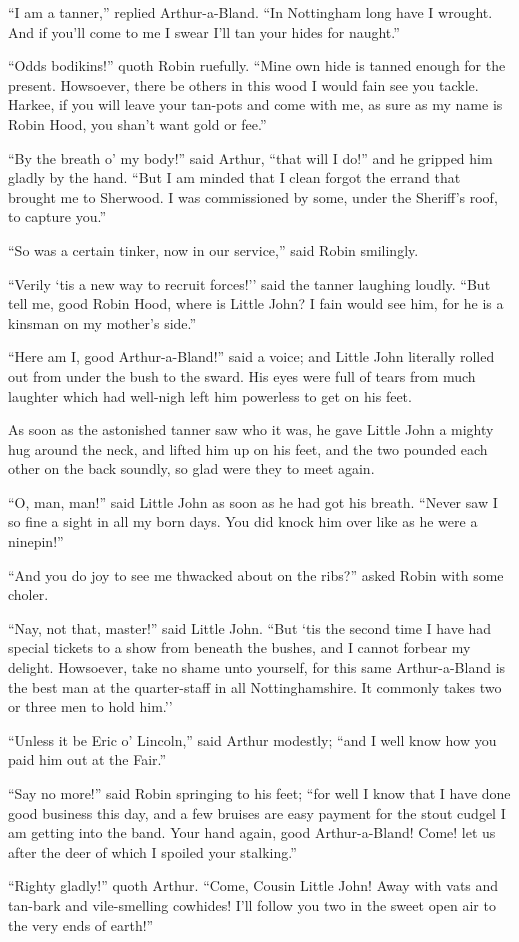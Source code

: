 ``I am a tanner,'' replied Arthur-a-Bland. ``In Nottingham long have I
wrought. And if you'll come to me I swear I'll tan your hides for
naught.''

``Odds bodikins!'' quoth Robin ruefully. ``Mine own hide is tanned
enough for the present. Howsoever, there be others in this wood I would
fain see you tackle. Harkee, if you will leave your tan-pots and come
with me, as sure as my name is Robin Hood, you shan't want gold or
fee.''

``By the breath o' my body!'' said Arthur, ``that will I do!'' and he
gripped him gladly by the hand. ``But I am minded that I clean forgot
the errand that brought me to Sherwood. I was commissioned by some,
under the Sheriff's roof, to capture you.''

``So was a certain tinker, now in our service,'' said Robin smilingly.

``Verily `tis a new way to recruit forces!'' said the tanner laughing
loudly. ``But tell me, good Robin Hood, where is Little John? I fain
would see him, for he is a kinsman on my mother's side.''

``Here am I, good Arthur-a-Bland!'' said a voice; and Little John
literally rolled out from under the bush to the sward. His eyes were
full of tears from much laughter which had well-nigh left him powerless
to get on his feet.

As soon as the astonished tanner saw who it was, he gave Little John a
mighty hug around the neck, and lifted him up on his feet, and the two
pounded each other on the back soundly, so glad were they to meet again.

``O, man, man!'' said Little John as soon as he had got his breath.
``Never saw I so fine a sight in all my born days. You did knock him
over like as he were a ninepin!''

``And you do joy to see me thwacked about on the ribs?'' asked Robin
with some choler.

``Nay, not that, master!'' said Little John. ``But `tis the second time
I have had special tickets to a show from beneath the bushes, and I
cannot forbear my delight. Howsoever, take no shame unto yourself, for
this same Arthur-a-Bland is the best man at the quarter-staff in all
Nottinghamshire. It commonly takes two or three men to hold him.''

``Unless it be Eric o' Lincoln,'' said Arthur modestly; ``and I well
know how you paid him out at the Fair.''

``Say no more!'' said Robin springing to his feet; ``for well I know
that I have done good business this day, and a few bruises are easy
payment for the stout cudgel I am getting into the band. Your hand
again, good Arthur-a-Bland! Come! let us after the deer of which I
spoiled your stalking.''

``Righty gladly!'' quoth Arthur. ``Come, Cousin Little John! Away with
vats and tan-bark and vile-smelling cowhides! I'll follow you two in the
sweet open air to the very ends of earth!''
